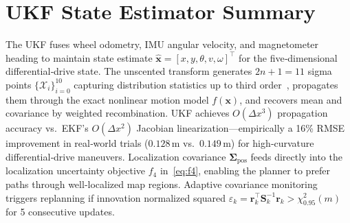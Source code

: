 \documentclass[lettersize,journal]{IEEEtran}
\begin{document}
\appendix
\section{UKF State Estimator Summary}
\label{app:ukf}

The UKF fuses wheel odometry, IMU angular velocity, and magnetometer heading
to maintain state estimate $\hat{\mathbf{x}} = [x,y,\theta,v,\omega]^\top$ for
the five‑dimensional differential‑drive state. The unscented transform
generates $2n+1 = 11$ sigma points $\{\mathcal{X}_i\}_{i=0}^{10}$ capturing
distribution statistics up to third order~\cite{Julier2004,Wan2000},
propagates them through the exact nonlinear motion model $f(\mathbf{x})$, and
recovers mean and covariance by weighted recombination. UKF achieves
$O(\Delta x^3)$ propagation accuracy vs.\ EKF's $O(\Delta x^2)$ Jacobian
linearization—empirically a 16\% RMSE improvement in real‑world trials
($0.128$\,m vs.\ $0.149$\,m) for high‑curvature differential‑drive maneuvers.
Localization covariance $\boldsymbol{\Sigma}_{\mathrm{pos}}$ feeds directly
into the localization uncertainty objective $f_4$ in~\eqref{eq:f4}, enabling
the planner to prefer paths through well‑localized map regions. Adaptive
covariance monitoring triggers replanning if innovation normalized squared
$\varepsilon_k = \mathbf{r}_k^\top\mathbf{S}_k^{-1}\mathbf{r}_k >
\chi^2_{0.95}(m)$ for 5 consecutive updates.



\end{document}
